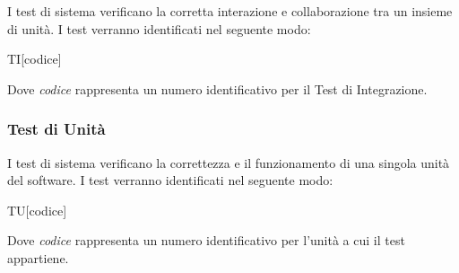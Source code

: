 \documentclass[../piano-di-qualifica.tex]{subfiles}
\begin{document}
I test di sistema verificano la corretta interazione e collaborazione tra un insieme di unità. I test verranno identificati nel seguente modo:
\begin{center}
  TI[codice]
\end{center}

Dove \textit{codice} rappresenta un numero identificativo per il Test di Integrazione.

\subsubsection{Test di Unità}%
\label{subs:test_di_unita}

I test di sistema verificano la correttezza e il funzionamento di una singola unità del software. I test verranno identificati nel seguente modo:
\begin{center}
  TU[codice]
\end{center}

Dove \textit{codice} rappresenta un numero identificativo per l'unità a cui il test appartiene.
\end{document}
